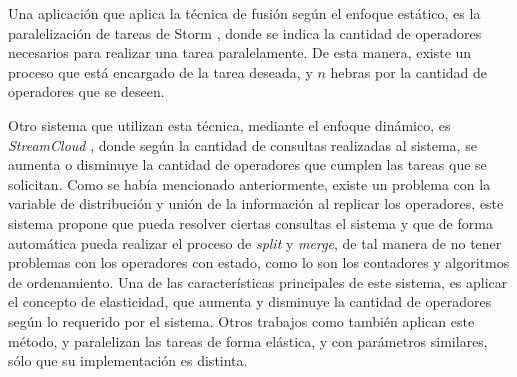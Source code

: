 

Una aplicación que aplica la técnica de fusión según el enfoque estático, es la paralelización de tareas de Storm \citep{bookstorm}, donde se indica la cantidad de operadores necesarios para realizar una tarea paralelamente. De esta manera, existe un proceso que está encargado de la tarea deseada, y $n$ hebras por la cantidad de operadores que se deseen.

Otro sistema que utilizan esta técnica, mediante el enfoque dinámico, es \textit{StreamCloud} \citep{GulisanoJPSV12}, donde según la cantidad de consultas realizadas al sistema, se aumenta o disminuye la cantidad de operadores que cumplen las tareas que se solicitan. Como se había mencionado anteriormente, existe un problema con la variable de distribución y unión de la información al replicar los operadores, este sistema propone que pueda resolver ciertas consultas el sistema y que de forma automática pueda realizar el proceso de \textit{split} y \textit{merge}, de tal manera de no tener problemas con los operadores con estado, como lo son los contadores y algoritmos de ordenamiento. Una de las características principales de este sistema, es aplicar el concepto de elasticidad, que aumenta y disminuye la cantidad de operadores según lo requerido por el sistema. Otros trabajos como \citep{GedikSHW14, SchneiderAGBW09} también aplican este método, y paralelizan las tareas de forma elástica, y con parámetros similares, sólo que su implementación es distinta.

